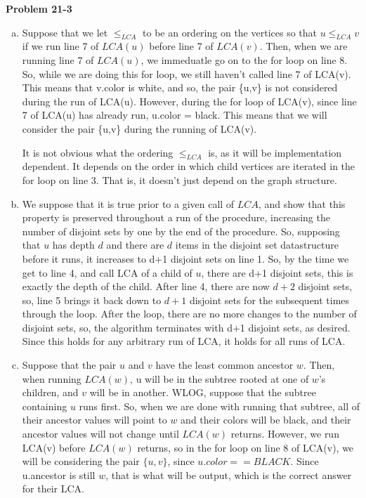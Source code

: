 \documentclass{article}
\begin{document}
\noindent\textbf{Problem 21-3}\\

\begin{enumerate}[a.]
\item

Suppose that we let $\le_{LCA}$ to be an ordering on the vertices so that $u\le_{LCA} v$ if we run line 7 of $LCA(u)$ before line 7 of $LCA(v)$. Then, when we are running line 7 of $LCA(u)$, we immeduatle go on to the for loop on line 8. So, while we are doing this for loop, we still haven't called line 7 of LCA(v). This means that v.color is white, and so, the pair \{u,v\} is not considered during the run of LCA(u). However, during the for loop of LCA(v), since line 7 of LCA(u) has already run, u.color = black. This means that we will consider the pair \{u,v\} during the running of LCA(v).

It is not obvious what the ordering $\le_{LCA}$ is, as it will be implementation dependent. It depends on the order in which child vertices are iterated in the for loop on line 3. That is, it doesn't just depend on the graph structure.

\item
We suppose that it is true prior to a given call of $LCA$, and show that this property is preserved throughout a run of the procedure, increasing the number of disjoint sets by one by the end of the procedure. So, supposing that $u$ has depth $d$ and there are $d$ items in the disjoint set datastructure before it runs, it increases to d+1 disjoint sets on line 1. So, by the time we get to line 4, and call LCA of a child of $u$, there are d+1 disjoint sets, this is exactly the depth of the child. After line 4, there are now $d+2$ disjoint sets, so, line 5 brings it back down to $d+1$ disjoint sets for the subsequent times through the loop. After the loop, there are no more changes to the number of disjoint sets, so, the algorithm terminates with d+1 disjoint sets, as desired. Since this holds for any arbitrary run of LCA, it holds for all runs of LCA.

\item
Suppose that the pair $u$ and $v$ have the least common ancestor $w$. Then, when running $LCA(w)$, u will be in the subtree rooted at one of $w$'s children, and $v$ will be in another. WLOG, suppose that the subtree containing $u$ runs first. So, when we are done with running that subtree, all of their ancestor values will point to $w$ and their colors will be black, and their ancestor values will not change until $LCA(w)$ returns. However, we run LCA(v) before $LCA(w)$ returns, so in the for loop on line 8 of LCA(v), we will be considering the pair $\{u,v\}$, since $u.color==BLACK$. Since u.ancestor is still $w$, that is what will be output, which is the correct answer for their LCA.


\end{enumerate}
\end{document}
